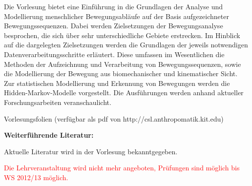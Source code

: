 \begin{course}
\begin{content}
Die Vorlesung bietet eine Einführung in die Grundlagen der Analyse und Modellierung menschlicher Bewegungsabläufe auf der Basis aufgezeichneter Bewegungssequenzen. Dabei werden Zielsetzungen der Bewegungsanalyse besprochen, die sich über sehr unterschiedliche Gebiete erstrecken. Im Hinblick auf die dargelegten Zielsetzungen werden die Grundlagen der jeweils notwendigen Datenverarbeitungsschritte erläutert. Diese umfassen im Wesentlichen die Methoden der Aufzeichnung und Verarbeitung von Bewegungssequenzen, sowie die Modellierung der Bewegung aus biomechanischer und kinematischer Sicht. Zur statistischen Modellierung und Erkennung von Bewegungen werden die Hidden-Markov-Modelle vorgestellt. Die Ausführungen werden anhand aktueller Forschungsarbeiten veranschaulicht.


\end{content}

\begin{media}Vorlesungsfolien (verfügbar als pdf von http://csl.anthropomatik.kit.edu)

\end{media}

\begin{literature}\textbf{Weiterführende Literatur:}

 

Aktuelle Literatur wird in der Vorlesung bekanntgegeben.

\end{literature}

\begin{remarks}\textcolor{red}{Die Lehrveranstaltung wird nicht mehr angeboten, Prüfungen sind möglich bis WS 2012/13 möglich.}

\end{remarks}

\end{course}